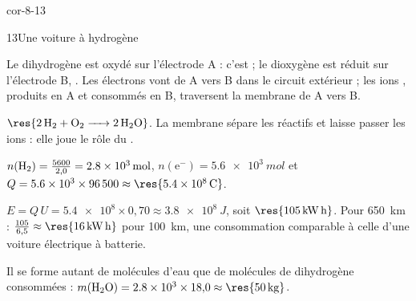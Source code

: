 \begin{blocLivre}{cor-8-13}
\begin{corrige}{13}{Une voiture à hydrogène}
\begin{questions}
\item Le dihydrogène est oxydé sur l'électrode A : c'est  ; le dioxygène est réduit sur l'électrode B,
. Les électrons vont de A vers B dans le circuit extérieur ; les ions , produits en A et
consommés en B, traversent la membrane de A vers B.
\item $\res{\ce{2 H2 + O2 -> 2 H2O}}$. La membrane sépare les réactifs et laisse passer les ions : elle joue le rôle du
.
\item $n(\ce{H2})=\frac{5600}{2{,}0}=\qty{2,8e3}{mol}$, $n(\mathrm{e}^-)=\qty{5,6e3}{mol}$ et
$Q=\num{5.6e3}\times\num{96500}\approx\res{\qty{5,4e8}{C}}$.
\item $E=Q\,U=\num{5.4e8}\times0{,}70\approx\qty{3,8e8}{J}$, soit $\res{\qty{105}{kW.h}}$. Pour 650~km :
$\frac{105}{6{,}5}\approx\res{\qty{16}{kW.h}}$ pour 100~km, une consommation comparable à celle d'une voiture électrique à
batterie.
\item Il se forme autant de molécules d'eau que de molécules de dihydrogène consommées :
$m(\ce{H2O})=\num{2.8e3}\times18{,}0\approx\res{\qty{50}{kg}}$.
\end{questions}
\end{corrige}
\end{blocLivre}
